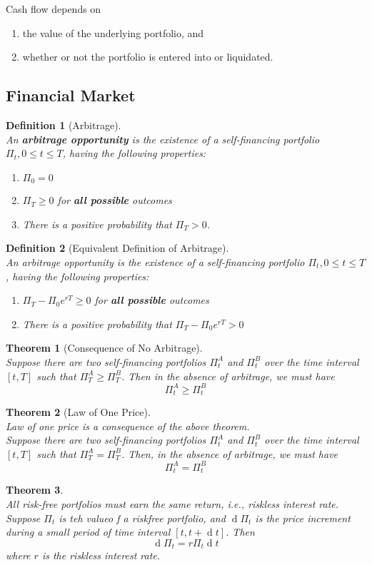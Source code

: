 \documentclass[12pt]{article}
\newtheorem{definition}{Definition}[section]
\newtheorem{theorem}{Theorem}[section]
\theoremstyle{definition}
\DeclareMathOperator{\diff}{d}
\begin{document}
Cash flow depends on
\begin{enumerate}
  \item the value of the underlying portfolio, and
  \item whether or not the portfolio is entered into or liquidated.
\end{enumerate}
\subsection{Financial Market}
\begin{definition}[Arbitrage]
\hfill\\\normalfont An \textbf{arbitrage opportunity} is the existence of a self-financing portfolio $\Pi_t, 0\leq t\leq T$, having the following properties:
\begin{enumerate}
  \item $\Pi_0=0$
  \item $\Pi_T\geq 0$ for \textbf{all possible} outcomes
  \item There is a positive probability that $\Pi_T>0$.
\end{enumerate}
\end{definition}
\begin{definition}[Equivalent Definition of Arbitrage]
\hfill\\\normalfont An arbitrage opportunity is the existence of a self-financing portfolio $\Pi_t, 0\leq t\leq T$, having the following properties:
\begin{enumerate}
  \item $\Pi_T-\Pi_0e^{rT}\geq 0$ for \textbf{all possible} outcomes
  \item There is a positive probability that $\Pi_T-\Pi_0e^{rT}>0$
\end{enumerate}
\end{definition}
\begin{theorem}[Consequence of No Arbitrage]
\hfill\\\normalfont Suppose there are two self-financing portfolios $\Pi_t^A$ and $\Pi_t^B$ over the time interval $[t,T]$ such that $\Pi_T^A\geq \Pi_T^B$. Then in the absence of arbitrage, we must have
\[
\Pi_t^A\geq \Pi_t^B
\]
\end{theorem}
\begin{theorem}[Law of One Price]
\hfill\\\normalfont Law of one price is a consequence of the above theorem.\\
Suppose there are two self-financing portfolios $\Pi_t^A$ and $\Pi_t^B$ over the time interval $[t,T]$ such that $\Pi_T^A = \Pi_T^B$. Then, in the absence of arbitrage, we must have
\[
\Pi_t^A = \Pi_t^B
\]
\end{theorem}
\begin{theorem}
\hfill\\\normalfont All \textit{risk-free} portfolios must earn the same return, i.e., \textit{riskless interest rate}. Suppose $\Pi_t$ is teh valueo f a riskfree portfolio, and $\diff\Pi_t$ is the price increment during a small period of time interval $[t,t+\diff t]$. Then
\[
\diff \Pi_t = r\Pi_t\diff t
\]
where $r$ is the riskless interest rate.
\end{theorem}
\end{document}
